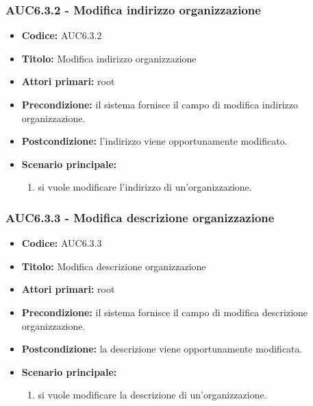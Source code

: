 \documentclass[casi-duso]{subfiles}
\begin{document}
\subsubsection{AUC6.3.2 - Modifica indirizzo organizzazione}%
\label{subsub:AUC6.3.2}
\begin{itemize}
  \item \textbf{Codice:} AUC6.3.2
  \item \textbf{Titolo:} Modifica indirizzo organizzazione
  \item \textbf{Attori primari:} root
  \item \textbf{Precondizione:} il sistema fornisce il campo di modifica indirizzo organizzazione.
  \item \textbf{Postcondizione:} l'indirizzo viene opportunamente modificato.
  \item \textbf{Scenario principale:}
  \begin{enumerate}
    \item si vuole modificare l'indirizzo di un'organizzazione.
  \end{enumerate}
\end{itemize}

\subsubsection{AUC6.3.3 - Modifica descrizione organizzazione}%
\label{subsub:AUC6.3.3}
\begin{itemize}
  \item \textbf{Codice:} AUC6.3.3
  \item \textbf{Titolo:} Modifica descrizione organizzazione
  \item \textbf{Attori primari:} root
  \item \textbf{Precondizione:} il sistema fornisce il campo di modifica descrizione organizzazione.
  \item \textbf{Postcondizione:} la descrizione viene opportunamente modificata.
  \item \textbf{Scenario principale:}
  \begin{enumerate}
    \item si vuole modificare la descrizione di un'organizzazione.
  \end{enumerate}
\end{itemize}
\end{document}
